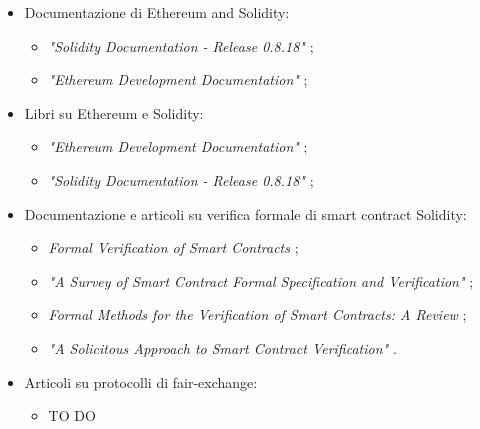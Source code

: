 \begin{itemize}
\begin{itemize}
\end{itemize}

\item Documentazione di Ethereum and Solidity:
\begin{itemize}

\item \textit{"Solidity Documentation - Release 0.8.18"} \cite{solidity0.8.18doc};

\item \textit{"Ethereum Development Documentation"} \cite{ethereum2024doc};

\end{itemize}

\item Libri su Ethereum e Solidity:
\begin{itemize}

\item \textit{"Ethereum Development Documentation"} \cite{ethereum2024doc};

\item \textit{"Solidity Documentation - Release 0.8.18"} \cite{solidity0.8.18doc};

\end{itemize}

\item Documentazione e articoli su verifica formale di smart contract Solidity:
\begin{itemize}

\item \textit{Formal Verification of Smart Contracts} \cite{ethereum2024scfv};

\item \textit{"A Survey of Smart Contract Formal Specification and Verification"} \cite{tolmach2021scfsvsurvey};

\item \textit{Formal Methods for the Verification of Smart Contracts: A Review} \cite{krichen2022scfmvreview};

\item \textit{"A Solicitous Approach to Smart Contract Verification"} \cite{otoni2023verification}.

\end{itemize}

\item Articoli su protocolli di fair-exchange:
\begin{itemize}
\item TO DO
\end{itemize}

\end{itemize}


